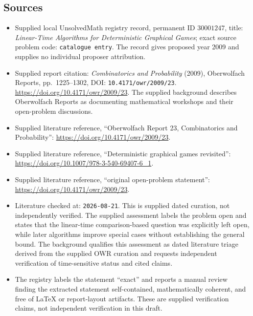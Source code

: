 \documentclass[11pt]{article}
\begin{document}
\subsection{Sources}
\begin{itemize}
\item Supplied local UnsolvedMath registry record, permanent ID \(30001247\), title: \emph{Linear-Time Algorithms for Deterministic Graphical Games}; exact source problem code: \texttt{catalogue entry}. The record gives proposed year 2009 and supplies no individual proposer attribution.
\item Supplied report citation: \emph{Combinatorics and Probability} (2009), Oberwolfach Reports, pp.\ 1225--1302, DOI: \texttt{10.4171/owr/2009/23}. \url{https://doi.org/10.4171/owr/2009/23}. The supplied background describes Oberwolfach Reports as documenting mathematical workshops and their open-problem discussions.
\item Supplied literature reference, ``Oberwolfach Report 23, Combinatorics and Probability'': \url{https://doi.org/10.4171/owr/2009/23}.
\item Supplied literature reference, ``Deterministic graphical games revisited'': \url{https://doi.org/10.1007/978-3-540-69407-6_1}.
\item Supplied literature reference, ``original open-problem statement'': \url{https://doi.org/10.4171/owr/2009/23}.
\item Literature checked at: \texttt{2026-08-21}. This is supplied dated curation, not independently verified. The supplied assessment labels the problem open and states that the linear-time comparison-based question was explicitly left open, while later algorithms improve special cases without establishing the general bound. The background qualifies this assessment as dated literature triage derived from the supplied OWR curation and requests independent verification of time-sensitive status and cited claims.
\item The registry labels the statement ``exact'' and reports a manual review finding the extracted statement self-contained, mathematically coherent, and free of LaTeX or report-layout artifacts. These are supplied verification claims, not independent verification in this draft.
\end{itemize}
\end{document}

